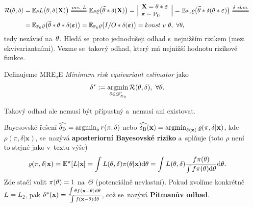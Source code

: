 \begin{dusl}
	\[
	\begin{split}
	\RF(\t,\delta)&=\E_\t L\big(\t,\delta(\textbf{X})\big)\equal{inv.~L}\E_\t\rho\big(\widetilde{\t}\ast\delta(\textbf{X})\big)=\Big|\begin{array}{l}
	\textbf{X}=\t\ast\boldsymbol{\epsilon}\\\boldsymbol{\epsilon}\sim\PP_0	
	\end{array}
	\Big|=\E_{\PP_0}\rho\big(\widetilde{\t}\ast\delta(\t\ast\boldsymbol{\epsilon})\big)\equal{\delta~ekvi.}\\&=\E_{\PP_0}\rho\big(\widetilde{\t}\ast\t\ast\delta(\boldsymbol{\epsilon})\big)=\E_{\PP_0}\rho\big(I/O\ast\delta(\boldsymbol{\epsilon})\big)=konst~v~\t,~\forall\t,
	\end{split}
	\]
	tedy nezávisí na~$\theta$. Hledá se~proto jednodušeji odhad s~nejnižším rizikem (mezi ekvivariantními). Vezme se~takový odhad, který má nejnižší hodnotu rizikové funkce. 
\end{dusl}
\begin{define}
	Definujeme MRE$_q$E \textit{Minimum risk equivariant estimator} jako $$ \delta^\ast:=\mathop{\mathrm{argmin}}_{\delta\in\mathscr{D}' _{Eq}}\mathcal{R}(\theta,\delta),~\forall\theta.$$
\end{define}
Takový odhad ale nemusí být přípustný a~nemusí ani existovat. 

\begin{remark}
	Bayesovské řešení $\widehat{\delta_\mathrm{B}}=\mathop{\mathrm{argmin}}_\delta r(\pi,\delta)$ nebo $\widehat{\delta_\mathrm{B}}(\textbf{x})= \mathop{\mathrm{argmin}}_{\delta(\textbf{x})}\varrho(\pi,\delta|\textbf{x})$, kde $\rho(\pi,\delta|\textbf{x})$, se~nazývá \textbf{aposteriorní Bayesovské riziko} a~splňuje (toto $\rho$ není to stejné jako v~textu výše) 
	$$ \varrho(\pi,\delta|\textbf{x})=\mathbb{E}^\pi[L|\textbf{x}]=\int L(\theta,\delta)\pi(\theta|\textbf{x})\mathrm{d}\theta=\int L(\theta,\delta)\frac{f \pi(\theta)}{\int f \pi(\theta)\mathrm{d}\theta}\mathrm{d}\theta.$$
	Zde stačí volit $\pi(\theta)=1$ na~$\Theta$ (potenciálně nevlastní). Pokud zvolíme konkrétně $L=L_2$, pak $\delta^\ast(\textbf{x})=\frac{\int\theta f(\textbf{x}-\theta)\mathrm{d}\theta}{\int f(\textbf{x}-\theta)\mathrm{d}\theta}$, což se~nazývá \textbf{Pitmanův odhad}.
\end{remark}

